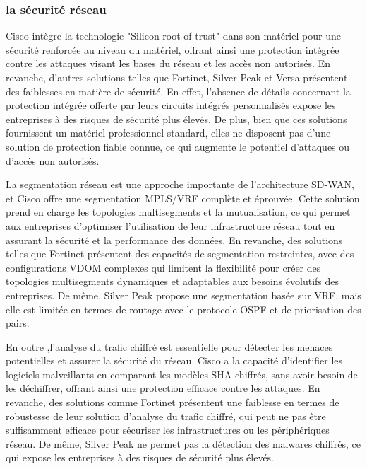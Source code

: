 \subsubsection{la sécurité réseau }

Cisco intègre la technologie "Silicon root of trust" dans son matériel pour une sécurité renforcée au niveau du  matériel, offrant ainsi une protection intégrée contre les attaques visant les bases du réseau et les accès non autorisés. En revanche, d'autres solutions telles que Fortinet, Silver Peak et Versa présentent des faiblesses en matière de sécurité. En effet, l'absence de détails concernant la protection intégrée offerte par leurs circuits intégrés personnalisés expose les entreprises à des risques de sécurité plus élevés. De plus, bien que ces solutions fournissent un matériel professionnel standard, elles ne disposent pas d'une solution de protection fiable connue, ce qui augmente le potentiel d'attaques ou d'accès non autorisés.

La segmentation réseau est une approche importante de l'architecture SD-WAN, et Cisco offre une segmentation MPLS/VRF complète et éprouvée. Cette solution prend en charge les topologies multisegments et la mutualisation, ce qui permet aux entreprises d'optimiser l'utilisation de leur infrastructure réseau tout en assurant la sécurité et la performance des données. En revanche, des solutions telles que Fortinet présentent des capacités de segmentation restreintes, avec des configurations VDOM complexes qui limitent la flexibilité pour créer des topologies multisegments dynamiques et adaptables aux besoins évolutifs des entreprises. De même, Silver Peak propose une segmentation basée sur VRF, mais elle est limitée en termes de routage avec le protocole OSPF et de priorisation des pairs.

En outre ,l'analyse du trafic chiffré est essentielle pour détecter les menaces potentielles et assurer la sécurité du réseau. Cisco a la capacité d’identifier les logiciels malveillants en comparant les modèles SHA chiffrés, sans avoir besoin de les déchiffrer, offrant ainsi une protection efficace contre les attaques. En revanche, des solutions comme Fortinet présentent une faiblesse en termes de robustesse de leur solution d'analyse du trafic chiffré, qui peut ne pas être suffisamment efficace pour sécuriser les infrastructures ou les périphériques réseau. De même, Silver Peak ne permet pas la détection des malwares chiffrés, ce qui expose les entreprises à des risques de sécurité plus élevés. 

